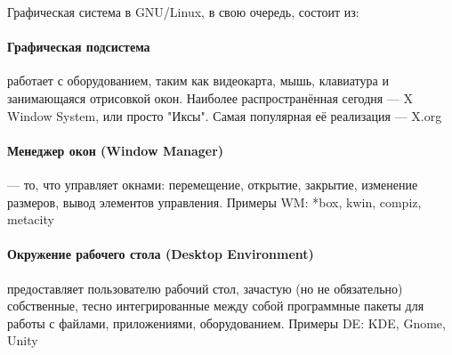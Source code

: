 Графическая система в GNU/Linux, в свою очередь, состоит из:

\paragraph{Графическая подсистема} работает с оборудованием, таким как видеокарта, мышь, клавиатура и занимающаяся отрисовкой окон. Наиболее распространённая сегодня --- X Window System, или просто "Иксы". Самая популярная её реализация --- X.org

\paragraph{Менеджер окон (Window Manager)} --- то, что управляет окнами: перемещение, открытие, закрытие, изменение размеров, вывод элементов управления. Примеры WM: *box, kwin, compiz, metacity

\paragraph{Окружение рабочего стола (Desktop Environment)} предоставляет пользователю рабочий стол, зачастую (но не обязательно) собственные, тесно интегрированные между собой программные пакеты для работы с файлами, приложениями, оборудованием. Примеры DE: KDE, Gnome, Unity
